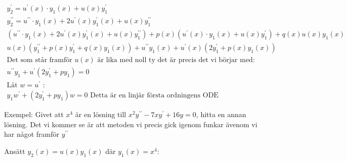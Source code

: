 \begin{equation*}
  \begin{gathered}
    y_{2}^{\prime}=u^{\prime}(x)\cdot y_1(x)+u(x)y_{1}^{\prime}\\
    y_{2}^{\prime\prime}= u^{\prime\prime}\cdot y_1(x)+2u^{\prime}(x)y_{1}^{\prime}(x)+u(x)y_{1}^{\prime\prime}\\
    (u^{\prime\prime}\cdot y_1(x)+2u^{\prime}(x)y_{1}^{\prime}(x)+u(x)y_{1}^{\prime\prime})+p(x)(u^{\prime}(x)\cdot y_1(x)+u(x)y_{1}^{\prime}) +q(x)u(x)y_1(x)\\
    u(x)(y_{1}^{\prime\prime}+p(x)y_{1}^{\prime}+q(x)y_1(x))+u^{\prime\prime}y_1(x)+u^{\prime}(x)(2y_{1}^{\prime}+p(x)y_1(x))\\
    \text{Det som står framför $u(x)$ är lika med noll ty det är precis det vi börjar med:}\\
    u^{\prime\prime}y_1+u^{\prime}(2y_{1}^{\prime}+py_1)=0\\
    \text{Låt } w=u^{\prime} \text{ :}\\
    y_1w^{\prime}+(2y_{1}^{\prime}+py_1)w=0 \text{ Detta är en linjär första ordningens ODE}
  \end{gathered}
\end{equation*}
\par\bigskip

\noindent Exempel: Givet att $x^4$ är en lösning till $x^2y^{\prime\prime}-7xy^{\prime}+16y=0$, hitta en annan lösning. Det vi kommer se är att metoden vi precis gick igenom funkar ävenom vi har något framför $y^{\prime\prime}$
\par\bigskip
\noindent Ansätt $y_2(x)=u(x)y_1(x)$ där $y_1(x)=x^4$:

